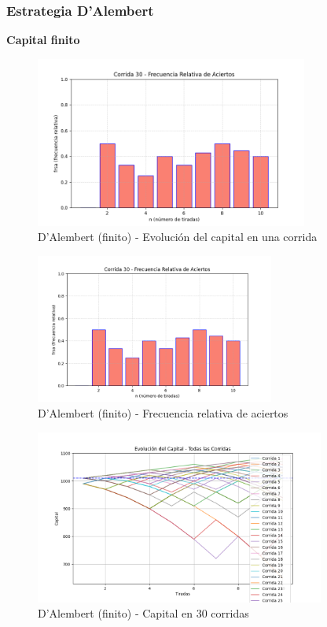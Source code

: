 \documentclass{article}
\begin{document}
\vspace{0.5cm}

\subsubsection*{Estrategia D’Alembert}

\textbf{Capital finito}

\begin{figure}
    \centering
    \includegraphics[width=0.8\textwidth]{./images/frsa_corrida_30_d_f.png}
    \caption{D’Alembert (finito) - Evolución del capital en una corrida}
\end{figure}

\begin{figure}
    \centering
    \includegraphics[width=0.7\textwidth]{./images/frsa_corrida_30_d_f.png}
    \caption{D’Alembert (finito) - Frecuencia relativa de aciertos}
\end{figure}

\begin{figure}
    \centering
    \includegraphics[width=0.85\textwidth]{./images/capital_todas_corridas_d_f.png}
    \caption{D’Alembert (finito) - Capital en 30 corridas}
\end{figure}
\end{document}
